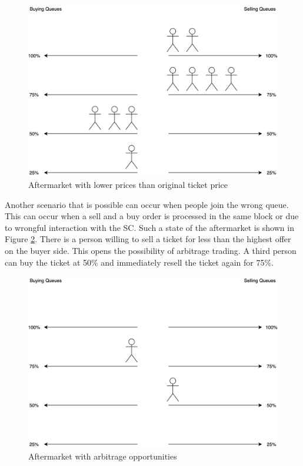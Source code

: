 \begin{figure}[H]
    \centering
    \includegraphics[width=12cm]{figures/aftermarket-mixed.png}
    \caption{Aftermarket with lower prices than original ticket price}
    \label{fig:aftermarket-mixed}
\end{figure}

Another scenario that is possible can occur when people join the wrong queue. This can occur when a sell and a buy order is processed in the same block or due to wrongful interaction with the SC. Such a state of the aftermarket is shown in Figure \ref{fig:aftermarket-arbitrage}. There is a person willing to sell a ticket for less than the highest offer on the buyer side. This opens the possibility of arbitrage trading. A third person can buy the ticket at 50\% and immediately resell the ticket again for 75\%. 

\begin{figure}[H]
    \centering
    \includegraphics[width=12cm]{figures/aftermarket-arbitrage.png}
    \caption{Aftermarket with arbitrage opportunities}
    \label{fig:aftermarket-arbitrage}
\end{figure}


